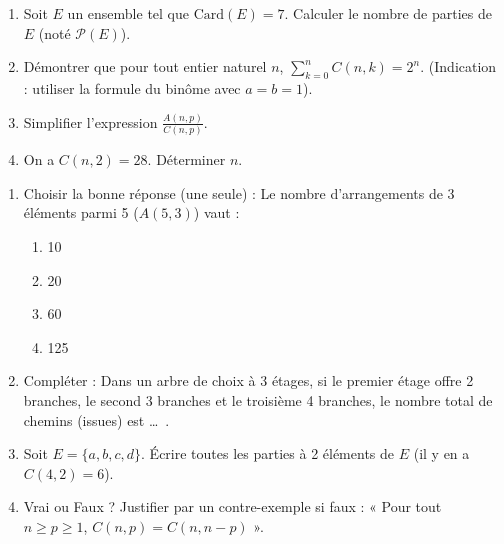 \documentclass[11pt]{article}
\begin{document}
\begin{exercice}
\begin{enumerate}
    \item Soit $E$ un ensemble tel que $\text{Card}(E) = 7$. Calculer le nombre de parties de $E$ (noté $\mathcal{P}(E)$).
    \item Démontrer que pour tout entier naturel $n$, $\sum_{k=0}^{n} C(n,k) = 2^n$. (Indication : utiliser la formule du binôme avec $a=b=1$).
    \item Simplifier l'expression $\frac{A(n, p)}{C(n, p)}$.
    \item On a $C(n, 2) = 28$. Déterminer $n$.
\end{enumerate}
\end{exercice}

\begin{exercice}
\begin{enumerate}
    \item Choisir la bonne réponse (une seule) : Le nombre d'arrangements de 3 éléments parmi 5 ($A(5,3)$) vaut :
    \begin{enumerate}
        \item 10 \item 20 \item 60 \item 125
    \end{enumerate}
    \item Compléter : Dans un arbre de choix à 3 étages, si le premier étage offre 2 branches, le second 3 branches et le troisième 4 branches, le nombre total de chemins (issues) est \ldots\ .
    \item Soit $E=\{a,b,c,d\}$. Écrire toutes les parties à 2 éléments de $E$ (il y en a $C(4,2)=6$).
    \item Vrai ou Faux ? Justifier par un contre-exemple si faux : « Pour tout $n \ge p \ge 1$, $C(n, p) = C(n, n-p)$ ».
\end{enumerate}
\end{exercice}
\end{document}
